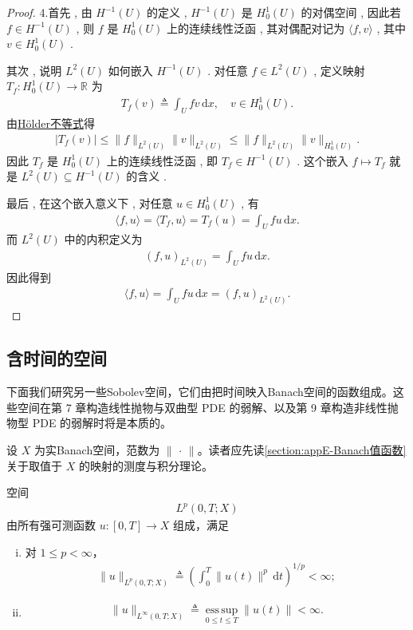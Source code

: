 \documentclass[../../main.tex]{subfiles}
\begin{document}
\begin{proof}
4.首先 , 由 $H^{-1}(U)$ 的定义 , $H^{-1}(U)$ 是 $H_0^1(U)$ 的对偶空间 ,
因此若 $f\in H^{-1}(U)$ , 则 $f$ 是 $H_0^1(U)$ 上的连续线性泛函 , 其对偶配对记为 $\langle f,v\rangle$ , 其中 $v\in H_0^1(U)$ .

其次 , 说明 $L^2(U)$ 如何嵌入 $H^{-1}(U)$ . 对任意 $f\in L^2(U)$ , 定义映射 $T_f:H_0^1(U)\to\mathbb R$ 为
\begin{align*}
T_f(v)\triangleq\int_U f v\,\mathrm{d}x,\quad v\in H_0^1(U).
\end{align*}
由\hyperref[Real Analysis-theorem:实变函数--Hölder不等式]{Hölder不等式}得
\begin{align*}
|T_f(v)|
\leqslant \|f\|_{L^2(U)}\|v\|_{L^2(U)}
\leqslant \|f\|_{L^2(U)}\|v\|_{H_0^1(U)}.
\end{align*}
因此 $T_f$ 是 $H_0^1(U)$ 上的连续线性泛函 , 即 $T_f\in H^{-1}(U)$ . 这个嵌入 $f\mapsto T_f$ 就是 $L^2(U)\subseteq H^{-1}(U)$ 的含义 .

最后 , 在这个嵌入意义下 , 对任意 $u\in H_0^1(U)$ , 有
\begin{align*}
\langle f,u\rangle
=\langle T_f,u\rangle
=T_f(u)
=\int_U f u\,\mathrm{d}x.
\end{align*}
而 $L^2(U)$ 中的内积定义为
\begin{align*}
(f,u)_{L^2(U)}=\int_U f u\,\mathrm{d}x.
\end{align*}
因此得到
\begin{align*}
\langle f,u\rangle=\int_U f u\,\mathrm{d}x=(f,u)_{L^2(U)}.
\end{align*}
\end{proof}

\subsection{含时间的空间}\label{subsection:ch05-含时间空间}

下面我们研究另一些Sobolev空间，它们由把时间映入Banach空间的函数组成。这些空间在第 7 章构造线性抛物与双曲型 PDE 的弱解、以及第 9 章构造非线性抛物型 PDE 的弱解时将是本质的。

设 $X$ 为实Banach空间，范数为 $\|\,\cdot\,\|$。读者应先读\cref{section:appE-Banach值函数} 关于取值于 $X$ 的映射的测度与积分理论。

\begin{definition}\label{definition:ch05-Lp时间}
空间
\begin{align*}
L^{p}(0,T;X)
\end{align*}
由所有强可测函数 $u:[0,T]\to X$ 组成，满足
\begin{enumerate}[(i)]
\item 对 $1\leqslant p<\infty$，
\begin{align*}
\|u\|_{L^{p}(0,T;X)}\triangleq\left(\int_{0}^{T}\|u(t)\|^{p}\,\mathrm{d}t\right)^{1/p}<\infty;
\end{align*}
\item
\begin{align*}
\|u\|_{L^{\infty}(0,T;X)}\triangleq\operatorname*{ess\,sup}_{0\leqslant t\leqslant T}\|u(t)\|<\infty.
\end{align*}
\end{enumerate}
\end{definition}
\end{document}
